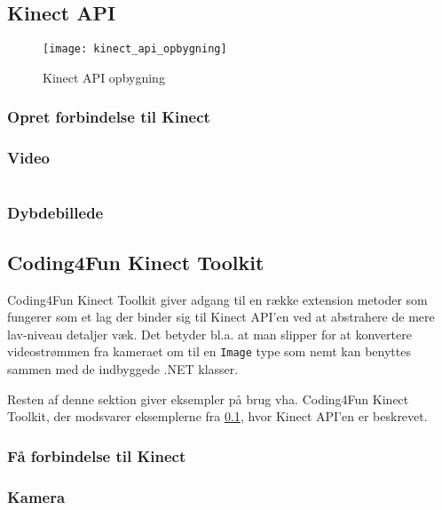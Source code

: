 \subsection{Kinect API}\label{kinect:kinectapi}


\begin{figure}
\centering
\texttt{[image: kinect\_api\_opbygning]}
\caption{Kinect API opbygning }
\label{kinect:apiopbygning}
\end{figure}


\subsubsection{Opret forbindelse til Kinect}

\subsubsection{Video}

\begin{lstlisting}[style=csharp,caption={Kinect SDK kamera},label=kinect:sdk-kamera]

\end{lstlisting}

\subsubsection{Dybdebillede}


\subsection{Coding4Fun Kinect Toolkit}
Coding4Fun Kinect Toolkit giver adgang til en række extension metoder som fungerer som et lag der binder sig til Kinect API'en ved at abstrahere de mere lav-niveau detaljer væk. Det betyder bl.a. at man slipper for at konvertere videostrømmen fra kameraet om til en \lstinline!Image! type som nemt kan benyttes sammen med de indbyggede .NET klasser.

Resten af denne sektion giver eksempler på brug vha. Coding4Fun Kinect Toolkit, der modsvarer eksemplerne fra \cref{kinect:kinectapi}, hvor Kinect API'en er beskrevet.

\subsubsection{Få forbindelse til Kinect}

\subsubsection{Kamera}

